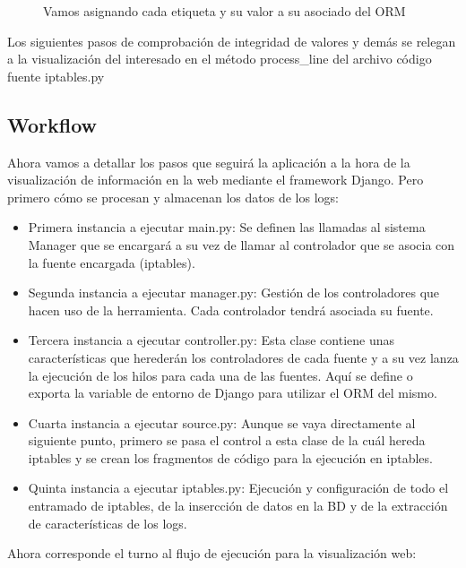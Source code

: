\begin{minipage}{\linewidth}
\begin{figure}[H]

\caption{Vamos asignando cada etiqueta y su valor a su asociado del ORM}
\end{figure}

Los siguientes pasos de comprobación de integridad de valores y demás se relegan a la visualización del interesado en el método process\_line del archivo código fuente iptables.py\\
\end{minipage}

\subsection{Workflow}
Ahora vamos a detallar los pasos que seguirá la aplicación a la hora de la visualización de información en la web mediante el framework Django. Pero primero cómo se procesan y almacenan los datos de los logs:\\

\begin{itemize}
\item Primera instancia a ejecutar main.py: Se definen las llamadas al sistema Manager que se encargará a su vez de llamar al controlador que se asocia con la fuente encargada (iptables).
\item Segunda instancia a ejecutar manager.py: Gestión de los controladores que hacen uso de la herramienta. Cada controlador tendrá asociada su fuente.
\item Tercera instancia a ejecutar controller.py: Esta clase contiene unas características que herederán los controladores de cada fuente y a su vez lanza la ejecución de los hilos para cada una de las fuentes. Aquí se define o exporta la variable de entorno de Django para utilizar el ORM del mismo.
\item Cuarta instancia a ejecutar source.py: Aunque se vaya directamente al siguiente punto, primero se pasa el control a esta clase de la cuál hereda iptables y se crean los fragmentos de código para la ejecución en iptables.
\item Quinta instancia a ejecutar iptables.py: Ejecución y configuración de todo el entramado de iptables, de la insercción de datos en la BD y de la extracción de características de los logs.
\end{itemize}

Ahora corresponde el turno al flujo de ejecución para la visualización web:\\

